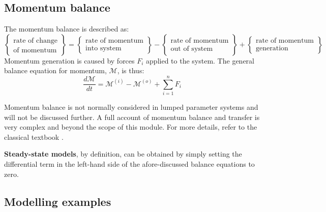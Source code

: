 \documentclass[a4paper,11pt]{article}
\theoremstyle{definition}
\begin{document}
\subsection*{Momentum balance}

The momentum balance is described as:
\[
	\left\{\substack{ \textrm{rate of change} \\ \textrm{of momentum} } \right\} = \left\{\substack{ \textrm{rate of momentum} \\ \textrm{into system} } \right\}	 
		- \left\{\substack{ \textrm{rate of momentum} \\ \textrm{out of system} } \right\} + \left\{\substack{ \textrm{rate of momentum} \\ \textrm{generation} } \right\}
\]
\noindent Momentum generation is caused by forces $F_i$ applied to the system. The general balance equation for momentum, $\mathcal M$, is thus:
\begin{equation}
	\frac{d \mathcal M}{d t} = \mathcal M^{(i)} - \mathcal M^{(o)} + \sum_{i=1}^n F_i
\end{equation}

Momentum balance is not normally considered in lumped parameter systems and will not be discussed further.
A full account of momentum balance and transfer is very complex and beyond the scope of this module.
For more details, refer to the classical textbook \citep{Bird2007}.

\vspace{0.8cm}
\textbf{Steady-state models}, by definition, can be obtained by simply setting the differential term in the
left-hand side of the afore-discussed balance equations to zero.

\subsection*{Modelling examples}
\end{document}
